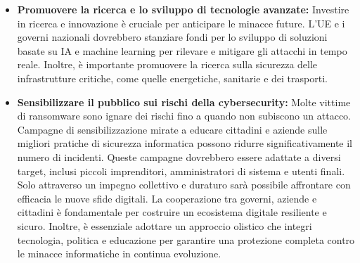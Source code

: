 \documentclass[a4paper,12pt]{article}
\begin{document}
\begin{itemize}
    \item \textbf{Promuovere la ricerca e lo sviluppo di tecnologie avanzate:} Investire in ricerca e innovazione è cruciale per anticipare le minacce future. L'UE e i governi nazionali dovrebbero stanziare fondi per lo sviluppo di soluzioni basate su IA e machine learning per rilevare e mitigare gli attacchi in tempo reale. Inoltre, è importante promuovere la ricerca sulla sicurezza delle infrastrutture critiche, come quelle energetiche, sanitarie e dei trasporti.
    \item \textbf{Sensibilizzare il pubblico sui rischi della cybersecurity:} Molte vittime di ransomware sono ignare dei rischi fino a quando non subiscono un attacco. Campagne di sensibilizzazione mirate a educare cittadini e aziende sulle migliori pratiche di sicurezza informatica possono ridurre significativamente il numero di incidenti. Queste campagne dovrebbero essere adattate a diversi target, inclusi piccoli imprenditori, amministratori di sistema e utenti finali.
Solo attraverso un impegno collettivo e duraturo sarà possibile affrontare con efficacia le nuove sfide digitali. La cooperazione tra governi, aziende e cittadini è fondamentale per costruire un ecosistema digitale resiliente e sicuro. Inoltre, è essenziale adottare un approccio olistico che integri tecnologia, politica e educazione per garantire una protezione completa contro le minacce informatiche in continua evoluzione.
\end{itemize}




\newpage
\end{document}
